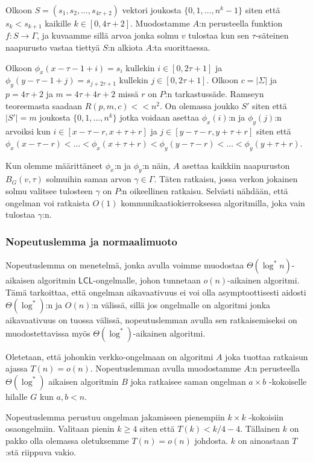 \documentclass[12pt,finnish]{tktltiki2}
\theoremstyle{definition}
\theoremstyle{remark}
\newcommand*{\lcl}{\ensuremath{\mathsf{LCL}}}
\begin{document}
Olkoon $S = (s_1, s_2,\dots,s_{4\tau+2})$ vektori joukosta $\{0, 1,\dots,n^k - 1\}$ siten että $s_k < s_{k+1}$ kaikille $k \in [0, 4\tau + 2]$. Muodostamme $A$:n perusteella funktion $f: S \rightarrow \Gamma$, ja kuvaamme sillä arvoa jonka solmu $v$ tulostaa kun sen $\tau$-säteinen naapurusto vastaa tiettyä $S$:n alkiota $A$:ta suorittaessa.

Olkoon $\phi_x(x - \tau - 1 + i) = s_i$ kullekin $i \in [0, 2\tau + 1]$ ja $\phi_y(y - \tau - 1 + j) = s_{j+2\tau+1}$ kullekin $j \in [0, 2\tau + 1]$. Olkoon $c = |\Sigma|$ ja $p = 4\tau + 2$ ja $m = 4\tau + 4r + 2$ missä $r$ on $P$:n tarkastussäde. Ramseyn teoreemasta saadaan $R(p, m, c) << n^2$. On olemassa joukko $S'$ siten että $|S'| = m$ joukosta $\{0, 1,\dots,n^k\}$ jotka voidaan asettaa $\phi_x(i)$:n ja $\phi_y(j)$:n arvoiksi kun $i \in [x - \tau - r, x + \tau + r]$ ja $j \in [y - \tau - r, y + \tau + r]$ siten että $\phi_x(x - \tau - r) < \dots < \phi_x(x + \tau + r) < \phi_y(y - \tau - r) < \dots < \phi_y(y + \tau + r)$.

Kun olemme määrittäneet $\phi_x$:n ja $\phi_y$:n näin, $A$ asettaa kaikkiin naapuruston $B_G(v, \tau)$ solmuihin saman arvon $\gamma \in \Gamma$. Täten ratkaisu, jossa verkon jokainen solmu valitsee tulosteen $\gamma$ on $P$:n oikeellinen ratkaisu. Selvästi nähdään, että ongelman voi ratkaista $O(1)$ kommunikaatiokierroksessa algoritmilla, joka vain tulostaa $\gamma$:n.

\subsubsection{Nopeutuslemma ja normaalimuoto}
Nopeutuslemma on menetelmä, jonka avulla voimme muodostaa $\Theta(\log^* n)$-aikaisen algoritmin \lcl -ongelmalle, johon tunnetaan $o(n)$-aikainen algoritmi. Tämä tarkoittaa, että ongelman aikavaativuus ei voi olla asymptoottisesti aidosti $\Theta(\log^*)$:n ja $O(n)$:n välissä, sillä jos ongelmalle on algoritmi jonka aikavaativuus on tuossa välissä, nopeutuslemman avulla sen ratkaisemiseksi on muodostettavissa myös $\Theta(\log^*)$-aikainen algoritmi.

Oletetaan, että johonkin verkko-ongelmaan on algoritmi $A$ joka tuottaa ratkaisun ajassa $T(n) = o(n)$. Nopeutuslemman avulla muodostamme $A$:n perusteella $\Theta(\log^*)$ aikaisen algoritmin $B$ joka ratkaisee saman ongelman $a \times b$ -kokoiselle hilalle $G$ kun $a, b < n$.

Nopeutuslemma perustuu ongelman jakamiseen pienempiin $k \times k$ -kokoisiin osaongelmiin. Valitaan pienin $k \geq 4$ siten että $T(k) < k/4 - 4$. Tällainen $k$ on pakko olla olemassa oletuksemme $T(n) = o(n)$ johdosta. $k$ on ainoastaan $T$:stä riippuva vakio.
\end{document}
